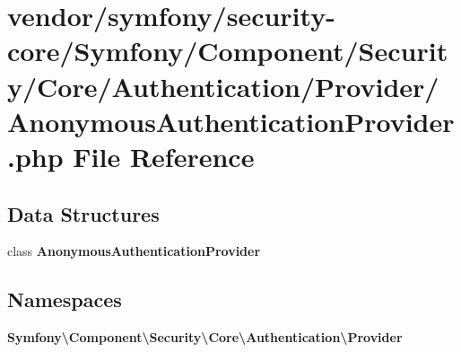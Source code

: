 \section{vendor/symfony/security-\/core/\+Symfony/\+Component/\+Security/\+Core/\+Authentication/\+Provider/\+Anonymous\+Authentication\+Provider.php File Reference}
\label{_anonymous_authentication_provider_8php}
\subsection*{Data Structures}
\begin{DoxyCompactItemize}
\item 
class {\bf Anonymous\+Authentication\+Provider}
\end{DoxyCompactItemize}
\subsection*{Namespaces}
\begin{DoxyCompactItemize}
\item 
 {\bf Symfony\textbackslash{}\+Component\textbackslash{}\+Security\textbackslash{}\+Core\textbackslash{}\+Authentication\textbackslash{}\+Provider}
\end{DoxyCompactItemize}
